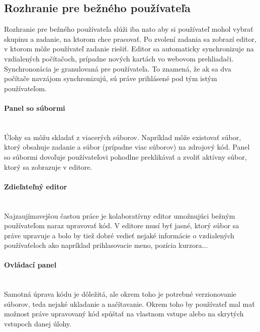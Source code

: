 \subsection{Rozhranie pre bežného používateľa}
Rozhranie pre bežného používateľa slúži iba nato aby si používateľ mohol vybrať skupinu a zadanie,
na ktorom chce pracovať. Po zvolení zadania sa zobrazí editor, v ktorom môže používateľ zadanie
riešiť. Editor sa automaticky synchronizuje na vzdialených počítačoch, prípadne nových kartách 
vo webovom prehliadači. Synchronozácia je granulovaná pre používateľa. To znamená, že ak sa dva
počítače navzájom synchronizujú, sú práve prihlásené pod tým istým používateľom.

\paragraph{Panel so súbormi}\leavevmode\\
Úlohy sa môžu skladať z viacerých súborov. Napríklad môže existovať súbor, ktorý
obsahuje zadanie a súbor (prípadne viac súborov) na zdrojový kód. Panel so súbormi dovoľuje
používateľovi pohodlne preklikávať a zvoliť aktívny súbor, ktorý sa zobrazuje v editore.

\paragraph{Zdieľateľný editor}\leavevmode\\
Najzaujímavejšou častou práce je kolaboratívny editor umožnujúci bežným používateľom naraz
upravovať kód. V editore musí byť jasné, ktorý súbor sa práve upravuje a bolo by
tiež dobré vedieť nejaké informácie o vzdialených používaťeloch ako napríklad prihlasovacie meno, 
pozícia kurzora...

\paragraph{Ovládací panel}\leavevmode\\
Samotná úprava kódu je dôležitá, ale okrem toho je potrebné verzionovanie
súborov, teda nejaké ukladanie a načítavanie. Okrem toho by používateľ mal mať možnost práve
upravovaný kód spúštať na vlastnom vstupe alebo na skrytých vstupoch danej úlohy.


